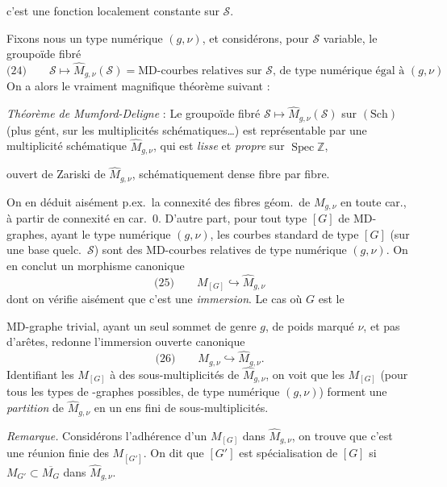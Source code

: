 \documentclass[11pt,a4paper]{article}
\begin{document}
c'est une fonction localement constante sur $\mathcal{S}$.

Fixons nous un type numérique  $(g,\nu)$, et considérons, pour $\mathcal{S}$ variable, le groupoïde fibré
\[
\text{(24)}\qquad \mathcal{S} \longmapsto \hat{M}_{g,\nu}(\mathcal{S}) = \text{MD-courbes relatives sur } \mathcal{S}\text{, de type numérique égal à } (g,\nu)
\]
On a alors le vraiment magnifique théorème suivant :

\emph{Théorème de Mumford-Deligne} : Le groupoïde fibré $\mathcal{S} \mapsto \hat{M}_{g,\nu}(\mathcal{S})$ sur $(\mathrm{Sch})$ (plus gént, sur les multiplicités schématiques…) est représentable par une multiplicité schématique $\hat{M}_{g,\nu}$, qui est \emph{lisse} et \emph{propre} sur $\operatorname{Spec} \mathbb{Z}$,  

ouvert de Zariski de $\hat{M}_{g,\nu}$, schématiquement dense fibre par fibre.

On en déduit aisément p.ex.\ la connexité des fibres géom.\ de $M_{g,\nu}$ en toute car., à partir de  connexité en car.~0. D'autre part, pour tout type $[G]$ de MD-graphes, ayant le type numérique $(g,\nu)$, les courbes standard de type $[G]$ (sur une base quelc.\ $\mathcal{S}$) sont  des MD-courbes relatives de type numérique $(g,\nu)$. On en conclut un morphisme canonique
\[
\text{(25)}\qquad M_{[G]} \hookrightarrow \hat{M}_{g,\nu}
\]
dont on vérifie aisément que c'est une \emph{immersion}. Le cas où $G$ est le

MD-graphe trivial, ayant un seul sommet de genre $g$, de poids marqué $\nu$, et pas d'arêtes, redonne l'immersion ouverte canonique
\[
\text{(26)}\qquad M_{g,\nu} \hookrightarrow \hat{M}_{g,\nu} .
\]
Identifiant les $M_{[G]}$ à des sous-multiplicités de $\hat{M}_{g,\nu}$, on voit que les $M_{[G]}$ (pour tous les types de -graphes possibles, de type numérique $(g,\nu)$) forment une \emph{partition} de $\hat{M}_{g,\nu}$ en un ens fini de sous-multiplicités.

\emph{Remarque.} Considérons l'adhérence d'un $M_{[G]}$ dans $\hat{M}_{g,\nu}$, on trouve que c'est une réunion finie  des $M_{[G']}$. On dit que $[G']$ est spécialisation de $[G]$ si $M_{G'} \subset \overline{M_G}$ dans $\hat{M}_{g,\nu}$.
\end{document}
